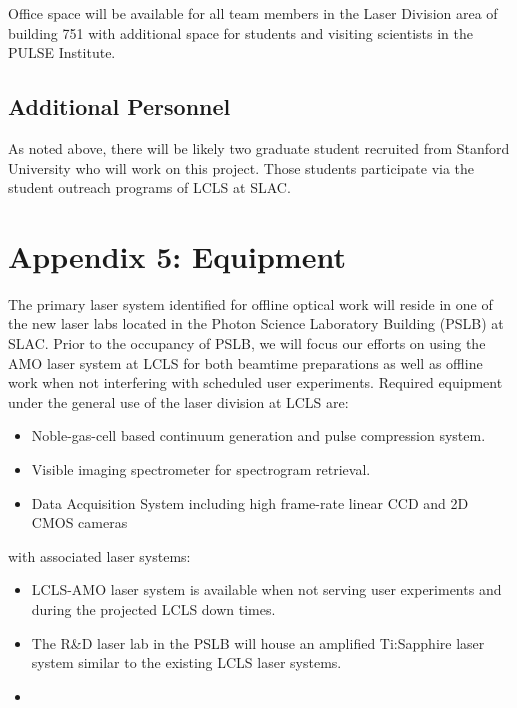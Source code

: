 \documentclass[letterpaper,oneside,11pt]{article}
\begin{document}
Office space will be available for all team members in the Laser Division area of building 751 with additional space for students and visiting scientists in the PULSE Institute.

\subsection*{Additional Personnel}

As noted above, there will be likely two graduate student recruited from Stanford University who will work on this project.
Those students participate via the student outreach programs of LCLS at SLAC.




\clearpage
\appendix
\section*{Appendix 5: Equipment}

\noindent The primary laser system identified for offline optical work will reside in one of the new laser labs located in the Photon Science Laboratory Building (PSLB) at SLAC.
Prior to the occupancy of PSLB, we will focus our efforts on using the AMO laser system at LCLS for both beamtime preparations as well as offline work when not interfering with scheduled user experiments.
Required equipment under the general use of the laser division at LCLS are:
\begin{itemize}
\item Noble-gas-cell based continuum generation and pulse compression system.
\item Visible imaging spectrometer for spectrogram retrieval.
\item Data Acquisition System including high frame-rate linear CCD and 2D CMOS cameras
\end{itemize}
\vspace{\baselineskip}
with associated laser systems: 
\begin{itemize}
\item LCLS-AMO laser system is available when not serving user experiments and during the projected LCLS down times.
\item The R\&D laser lab in the PSLB will house an amplified Ti:Sapphire laser system similar to the existing LCLS laser systems.
\item 
\end{itemize}
\vspace{\baselineskip}
\end{document}

